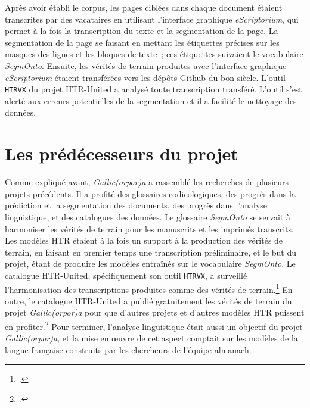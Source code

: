 \documentclass[class=article, crop=false]{standalone}
\begin{document}
Après avoir établi le corpus, les pages ciblées dans chaque document étaient transcrites par des vacataires en utilisant l'interface graphique \textit{eScriptorium}, qui permet à la fois la transcription du texte et la segmentation de la page. La segmentation de la page se faisant en mettant les étiquettes précises sur les masques des lignes et les bloques de texte~; ces étiquettes suivaient le vocabulaire \textit{SegmOnto}. Ensuite, les vérités de terrain produites avec l'interface graphique \textit{eScriptorium} étaient transférées vers les dépôts Github du bon siècle. L'outil \texttt{HTRVX} du projet \Gls{HTR-United} a analysé toute transcription transféré. L'outil s'est alerté aux erreurs potentielles de la segmentation et il a facilité le nettoyage des données.


\section{Les prédécesseurs du projet}
Comme expliqué avant, \textit{Gallic(orpor)a} a rassemblé les recherches de plusieurs projets précédents. Il a profité des glossaires codicologiques, des progrès dans la prédiction et  la segmentation des documents, des progrès dans l'analyse linguistique, et des catalogues des données. Le glossaire \textit{SegmOnto} se servait à harmoniser les vérités de terrain pour les manuscrits et les imprimés transcrits. Les modèles \acrshort{HTR} étaient à la fois un support à la production des vérités de terrain, en faisant en premier temps une transcription préliminaire, et le but du projet, étant de produire les modèles entraînés sur le vocabulaire \textit{SegmOnto}. Le catalogue \Gls{HTR-United}, spécifiquement son outil \texttt{HTRVX}, a surveillé l'harmonisation des transcriptions produites comme des vérités de terrain.\footcite{clericeHTRVXHTRValidation2021} En outre, le catalogue \Gls{HTR-United} a publié gratuitement les vérités de terrain du projet \textit{Gallic(orpor)a} pour que d'autres projets et d'autres modèles \acrshort{HTR} puissent en profiter.\footcite{chagueSharingHTRDatasets2022} Pour terminer, l'analyse linguistique était aussi un objectif du projet \textit{Gallic(orpor)a}, et la mise en œuvre de cet aspect comptait sur les modèles de la langue française construits par les chercheurs de l'équipe \acrshort{almanach}.
\end{document}
